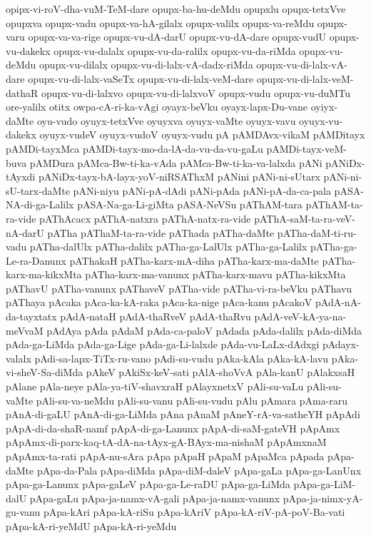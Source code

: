 {opipx-vi-roV-dha-vuM-TeM-dare
opupx-ba-hu-deMdu
opupxlu
opupx-tetxVve
opupxva
opupx-vadu
opupx-va-hA-gilalx
opupx-valilx
opupx-va-reMdu
opupx-varu
opupx-va-va-rige
opupx-vu-dA-darU
opupx-vu-dA-dare
opupx-vudU
opupx-vu-dakekx
opupx-vu-dalalx
opupx-vu-da-ralilx
opupx-vu-da-riMda
opupx-vu-deMdu
opupx-vu-dilalx
opupx-vu-di-lalx-vA-dadx-riMda
opupx-vu-di-lalx-vA-dare
opupx-vu-di-lalx-vaSeTx
opupx-vu-di-lalx-veM-dare
opupx-vu-di-lalx-veM-dathaR
opupx-vu-di-lalxvo
opupx-vu-di-lalxvoV
opupx-vudu
opupx-vu-duMTu
ore-yalilx
otitx
owpa-cA-ri-ka-vAgi
oyayx-beVku
oyayx-lapx-Du-vane
oyiyx-daMte
oyu-vudo
oyuyx-tetxVve
oyuyxva
oyuyx-vaMte
oyuyx-vavu
oyuyx-vu-dakekx
oyuyx-vudeV
oyuyx-vudoV
oyuyx-vudu
pA
pAMDAvx-vikaM
pAMDitayx
pAMDi-tayxMca
pAMDi-tayx-mo-da-lA-da-vu-da-vu-gaLu
pAMDi-tayx-veM-buva
pAMDura
pAMca-Bw-ti-ka-vAda
pAMca-Bw-ti-ka-va-lalxda
pANi
pANiDx-tAyxdi
pANiDx-tayx-bA-layx-yoV-niRSAThxM
pANini
pANi-ni-sUtarx
pANi-ni-sU-tarx-daMte
pANi-niyu
pANi-pA-dAdi
pANi-pAda
pANi-pA-da-ca-pala
pASA-NA-di-ga-Lalilx
pASA-Na-ga-Li-giMta
pASA-NeVSu
pAThAM-tara
pAThAM-ta-ra-vide
pAThAcacx
pAThA-natxra
pAThA-natx-ra-vide
pAThA-saM-ta-ra-veV-nA-darU
pATha
pAThaM-ta-ra-vide
pAThada
pATha-daMte
pATha-daM-ti-ru-vadu
pATha-dalUlx
pATha-dalilx
pATha-ga-LalUlx
pATha-ga-Lalilx
pATha-ga-Le-ra-Danunx
pAThakaH
pATha-karx-mA-diha
pATha-karx-ma-daMte
pATha-karx-ma-kikxMta
pATha-karx-ma-vanunx
pATha-karx-mavu
pATha-kikxMta
pAThavU
pATha-vanunx
pAThaveV
pATha-vide
pATha-vi-ra-beVku
pAThavu
pAThaya
pAcaka
pAca-ka-kA-raka
pAca-ka-nige
pAca-kanu
pAcakoV
pAdA-nA-da-tayxtatx
pAdA-nataH
pAdA-thaRveV
pAdA-thaRvu
pAdA-veV-kA-ya-na-meVvaM
pAdAya
pAda
pAdaM
pAda-ca-paloV
pAdada
pAda-dalilx
pAda-diMda
pAda-ga-LiMda
pAda-ga-Lige
pAda-ga-Li-lalxde
pAda-vu-LaLx-dAdxgi
pAdayx-valalx
pAdi-sa-lapx-TiTx-ru-vano
pAdi-su-vudu
pAka-kAla
pAka-kA-lavu
pAka-vi-sheV-Sa-diMda
pAkeV
pAkiSx-keV-sati
pAlA-shoVvA
pAla-kanU
pAlakxsaH
pAlane
pAla-neye
pAla-ya-tiV-shavxraH
pAlayxnetxV
pAli-su-vaLu
pAli-su-vaMte
pAli-su-va-neMdu
pAli-su-vanu
pAli-su-vudu
pAlu
pAmara
pAma-raru
pAnA-di-gaLU
pAnA-di-ga-LiMda
pAna
pAnaM
pAneY-rA-va-satheYH
pApAdi
pApA-di-da-shaR-namf
pApA-di-ga-Lanunx
pApA-di-saM-gateVH
pApAmx
pApAmx-di-parx-kaq-tA-dA-na-tAyx-gA-BAyx-ma-nishaM
pApAmxnaM
pApAmx-ta-rati
pApA-nu-sAra
pApa
pApaH
pApaM
pApaMca
pApada
pApa-daMte
pApa-da-Pala
pApa-diMda
pApa-diM-daleV
pApa-gaLa
pApa-ga-LanUnx
pApa-ga-Lanunx
pApa-gaLeV
pApa-ga-Le-raDU
pApa-ga-LiMda
pApa-ga-LiM-dalU
pApa-gaLu
pApa-ja-namx-vA-gali
pApa-ja-namx-vanunx
pApa-ja-nimx-yA-gu-vanu
pApa-kAri
pApa-kA-riSu
pApa-kAriV
pApa-kA-riV-pA-poV-Ba-vati
pApa-kA-ri-yeMdU
pApa-kA-ri-yeMdu
}

